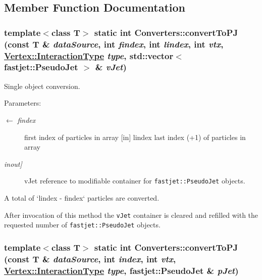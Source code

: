 \subsection{Member Function Documentation}
\hypertarget{structConverters_fd8fb82b02a0287cf8308b76bb69b4ff}{
\subsubsection[convertToPJ]{\setlength{\rightskip}{0pt plus 5cm}template$<$class T$>$ static int Converters::convert\-To\-PJ (const T \& {\em data\-Source}, int {\em findex}, int {\em lindex}, int {\em vtx}, \hyperlink{classVertex_0d80a5c5ed3bd9be72a325aa448eca25}{Vertex::Interaction\-Type} {\em type}, std::vector$<$ fastjet::Pseudo\-Jet $>$ \& {\em v\-Jet})}}
\label{structConverters_fd8fb82b02a0287cf8308b76bb69b4ff}


Single object conversion. 

\begin{Desc}
\item[Parameters:]
\begin{description}
\item[\mbox{$\leftarrow$} {\em findex}]first index of particles in array \mbox{[}in\mbox{]} lindex last index (+1) of particles in array \item[{\em inout\mbox{]}}]v\-Jet reference to modifiable container for {\tt fastjet::Pseudo\-Jet} objects.\end{description}
\end{Desc}
A total of `lindex - findex` particles are converted.

After invocation of this method the {\tt v\-Jet} container is cleared and refilled with the requested number of {\tt fastjet::Pseudo\-Jet} objects. \hypertarget{structConverters_37bc9dc22fcd3559eb5bcb2cfefdb8ae}{
\subsubsection[convertToPJ]{\setlength{\rightskip}{0pt plus 5cm}template$<$class T$>$ static int Converters::convert\-To\-PJ (const T \& {\em data\-Source}, int {\em index}, int {\em vtx}, \hyperlink{classVertex_0d80a5c5ed3bd9be72a325aa448eca25}{Vertex::Interaction\-Type} {\em type}, fastjet::Pseudo\-Jet \& {\em p\-Jet})}}
\label{structConverters_37bc9dc22fcd3559eb5bcb2cfefdb8ae}


